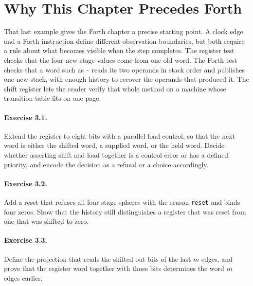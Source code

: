 
\section{Why This Chapter Precedes Forth}

That last example gives the Forth chapter a precise starting point. A clock edge and a Forth instruction define different observation boundaries, but both require a rule about what becomes visible when the step completes. The register test checks that the four new stage values come from one old word. The Forth test checks that a word such as \texttt{-} reads its two operands in stack order and publishes one new stack, with enough history to recover the operands that produced it. The shift register lets the reader verify that whole method on a machine whose transition table fits on one page.

\paragraph{Exercise 3.1.} Extend the register to eight bits with a parallel-load control, so that the next word is either the shifted word, a supplied word, or the held word. Decide whether asserting shift and load together is a control error or has a defined priority, and encode the decision as a refusal or a choice accordingly.

\paragraph{Exercise 3.2.} Add a reset that refuses all four stage spheres with the reason \texttt{reset} and binds four zeros. Show that the history still distinguishes a register that was reset from one that was shifted to zero.

\paragraph{Exercise 3.3.} Define the projection that reads the shifted-out bits of the last $m$ edges, and prove that the register word together with those bits determines the word $m$ edges earlier.
